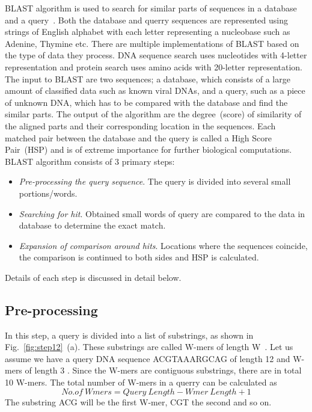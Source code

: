 BLAST algorithm is used to search for similar parts of sequences in a database and a query~\cite{Stephen1990}. 
Both the database and querry sequences are represented using strings of English alphabet with each letter representing a nucleobase such as Adenine, Thymine etc.
There are multiple implementations of BLAST based on the type of data they process. 
DNA sequence search uses nucleotides with 4-letter  representation and protein search uses amino acids with 20-letter representation. 
The input to BLAST are two sequences; a database, which consists of a large amount of classified data such as known viral DNAs, and a query, such as a piece of unknown DNA, which has to be compared with the database and find the similar parts. 
The output of the algorithm are the degree~(score) of similarity of the aligned parts and their corresponding location in the sequences. 
Each matched pair between the database and the query is called a High Score Pair~(HSP) and is of extreme importance for further biological computations. 
BLAST algorithm consists of 3 primary steps:
\begin{itemize}
\item{\textit{Pre-processing the query sequence}. The query is divided into several small portions/words.} 
\item{\textit{Searching for hit}. Obtained small words of query are compared to the data in database to determine the exact match.}
\item{\textit{Expansion of comparison around hits}. Locations where the sequences coincide, the comparison is continued to both sides and HSP is calculated.}
\end{itemize}
Details of each step is discussed in detail below.

\subsection{Pre-processing}
In this step, a query is divided into a list of substrings, as shown in Fig.~\ref{fig:step12}~(a). 
These substrings are called W-mers of length W~\cite{sotiriades2007design}. 
Let us assume we have a query DNA sequence ACGTAAARGCAG of length 12 and W-mers of length 3 \cite{sotiriades2007design}. 
Since the W-mers are contiguous substrings, there are in total 10 W-mers. 
The total number of W-mers in a querry can be calculated as 
\begin{equation}
\label{eq1}
No.of \ Wmers = Query \ Length - Wmer \ Length + 1 
\end{equation}
The substring ACG will be the first W-mer, CGT the second and so on. 



